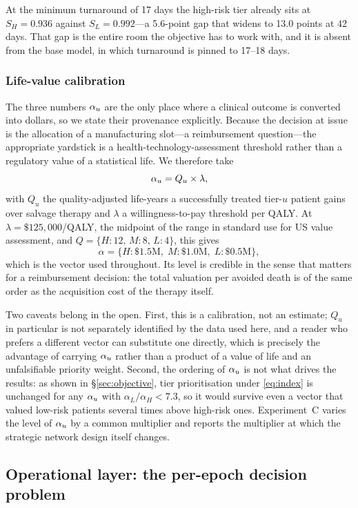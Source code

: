 At the minimum turnaround of 17 days the high-risk tier already sits at $S_H =
0.936$ against $S_L = 0.992$---a 5.6-point gap that widens to 13.0 points at 42
days. That gap is the entire room the objective has to work with, and it is
absent from the base model, in which turnaround is pinned to 17--18 days.

\subsubsection{Life-value calibration}

The three numbers $\alpha_{u}$ are the only place where a clinical outcome is
converted into dollars, so we state their provenance explicitly. Because the
decision at issue is the allocation of a manufacturing slot---a reimbursement
question---the appropriate yardstick is a health-technology-assessment
threshold rather than a regulatory value of a statistical life. We therefore
take
\[
  \alpha_{u} = Q_u \times \lambda,
\]
with $Q_u$ the quality-adjusted life-years a successfully treated tier-$u$
patient gains over salvage therapy and $\lambda$ a willingness-to-pay threshold
per QALY. At $\lambda = \$125{,}000$/QALY, the midpoint of the range in
standard use for US value assessment, and $Q = \{H\!: 12,\, M\!: 8,\, L\!:
4\}$, this gives
\[
  \alpha = \{H\!: \$1.5\text{M},\; M\!: \$1.0\text{M},\; L\!: \$0.5\text{M}\},
\]
which is the vector used throughout. Its level is credible in the sense that
matters for a reimbursement decision: the total valuation per avoided death is
of the same order as the acquisition cost of the therapy itself.

Two caveats belong in the open. First, this is a calibration, not an estimate;
$Q_u$ in particular is not separately identified by the data used here, and a
reader who prefers a different vector can substitute one directly, which is
precisely the advantage of carrying $\alpha_{u}$ rather than a product of a value
of life and an unfalsifiable priority weight. Second, the ordering of $\alpha_{u}$
is not what drives the results: as shown in \S\ref{sec:objective}, tier
prioritisation under \eqref{eq:index} is unchanged for any $\alpha_{u}$ with
$\alpha_L/\alpha_H < 7.3$, so it would survive even a vector that valued
low-risk patients several times above high-risk ones. Experiment~C varies the
level of $\alpha_{u}$ by a common multiplier and reports the multiplier at which
the strategic network design itself changes.

\subsection{Operational layer: the per-epoch decision problem}
\label{sec:epoch}

